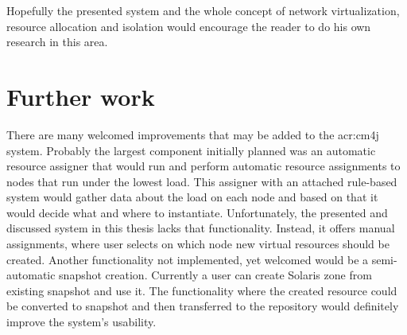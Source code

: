 \documentclass[11pt,openany]{book}
\begin{document}
      Hopefully the presented system and the whole concept of network virtualization, resource allocation and isolation 
	    would encourage the reader to do his own research in this area.
		

    \section{Further work}
		\label{sub:sum:further}
	
      There are many welcomed improvements that may be added to the \gls{acr:cm4j} system. Probably the largest
      component initially planned was an automatic resource assigner that would run and perform automatic resource
      assignments to nodes that run under the lowest load. This assigner with an attached rule-based system would gather
      data about the load on each node and based on that it would decide what and where to instantiate.  Unfortunately,
      the presented and discussed system in this thesis lacks that functionality. Instead, it offers manual assignments,
      where user selects on which node new virtual resources should be created. Another functionality not implemented,
      yet welcomed would be a semi-automatic snapshot creation. Currently a user can create Solaris zone from existing
      snapshot and use it. The functionality where the created resource could be converted to snapshot and then
      transferred to the repository would definitely improve the system's usability.


  \printglossaries

  
  

\end{document}
